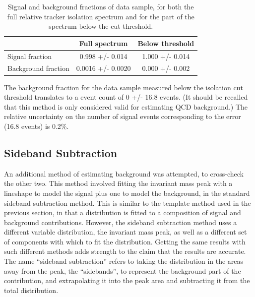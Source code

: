 \begin{table}[htbp]
  \begin{center}
    \caption[Signal and background fractions of data sample]{
      Signal and background fractions of data sample, 
      for both the full relative tracker isolation 
      spectrum and for the part of the spectrum 
      below the cut threshold.  
    }
    \label{TableSignalBGFractions}
    \begin{tabular}[]{ | l | c | c | }
      \hline
      & Full spectrum & Below threshold  \\ \hline \hline
      Signal fraction & 0.998 +/- 0.014 & 1.000 +/- 0.014 \\ \hline 
      Background fraction & 0.0016 +/- 0.0020 & 0.000 +/- 0.002 \\ \hline
    \end{tabular}
  \end{center}
\end{table}

The background fraction for the data sample measured 
below the isolation cut threshold 
translates to a event count of 0 +/- 16.8 events.  
(It should be recalled that this method is only 
considered valid for estimating QCD background.)  
The relative uncertainty on the number of signal 
events corresponding to the error (16.8 events) 
is 0.2\%.  


\subsection{Sideband Subtraction}
\label{anMeth:BGSubSideband}

An additional method of estimating background was 
attempted, to cross-check the other two.  
This method involved fitting the invariant mass 
peak with a lineshape to model the signal plus 
one to model the background, 
in the standard sideband subtraction method.  
This is similar to the template method used in 
the previous section, 
in that a distribution is fitted to a composition 
of signal and background contributions.  
However, the sideband subtraction method 
uses a different variable distribution, 
the invariant mass peak, 
as well as a different set of components 
with which to fit the distribution.  
Getting the same results with such 
different methods adds strength to 
the claim that the results are accurate.  
The name ``sideband subtraction'' refers 
to taking the distribution in 
the areas away from the peak, the ``sidebands'', 
to represent the background part of the contribution, 
and extrapolating it into the peak area and 
subtracting it from the total distribution.  

